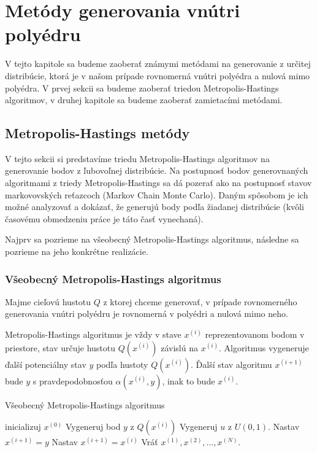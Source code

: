 \chapter{Metódy generovania vnútri polyédru}

V tejto kapitole sa budeme zaoberať známymi metódami na generovanie z určitej distribúcie, ktorá je v našom prípade rovnomerná vnútri polyédra a nulová mimo polyédra. V prvej sekcii sa budeme zaoberať triedou Metropolis-Hastings algoritmov, v druhej kapitole sa budeme zaoberať zamietacími metódami.

\section{Metropolis-Hastings metódy}

V tejto sekcii si predstavíme triedu Metropolis-Hastings algoritmov na generovanie bodov z ľubovoľnej distribúcie. Na postupnosť bodov generovnaných algoritmami z triedy Metropolis-Hastings sa dá pozerať ako na postupnosť stavov markovovských reťazcoch (Markov Chain Monte Carlo). Daným spôsobom je ich možné analyzovať a dokázať, že generujú body podľa žiadanej distribúcie (kvôli časovému obmedzeniu práce je táto časť vynechaná).

Najprv sa pozrieme na všeobecný Metropolis-Hastings algoritmus, následne sa pozrieme na jeho konkrétne realizácie.

\subsection{Všeobecný Metropolis-Hastings algoritmus}

Majme cieľovú hustotu $Q$ z ktorej chceme generovať, v prípade rovnomerného generovania vnútri polyédru je rovnomerná v polyédri a nulová mimo neho.

Metropolis-Hastings algoritmus je vždy v stave $x^{(i)}$ reprezentovanom bodom v priestore, stav určuje hustotu $Q(x^{(i)})$ závislú na $x^{(i)}$. Algoritmus vygeneruje ďalší potenciálny stav $y$ podľa hustoty $Q(x^{(i)})$. Ďalší stav algoritmu $x^{(i+1)}$ bude $y$ s pravdepodobnosťou $\alpha (x^{(i)},y)$, inak to bude $x^{(i)}$.

\begin{algorithm}[H]
	\caption{Všeobecný Metropolis-Hastings algoritmus \cite{metropolis-hastings_chib}}
	\label{metropolis-hastings}
	\begin{algorithmic}[1]
		\State inicializuj $x^{(0)}$
			\State Vygeneruj bod $y$ z $Q(x^{(i)})$
			\State Vygeneruj $u$ z $U(0,1)$.
				\State Nastav $x^{(i+1)}=y$
			\Else
				\State Nastav $x^{(i+1)}=x^{(i)}$
			\EndIf
		\EndFor
		\State Vráť ${x^{(1)},x^{(2)},\dots,x^{(N)}}$.
	\end{algorithmic}
\end{algorithm}

